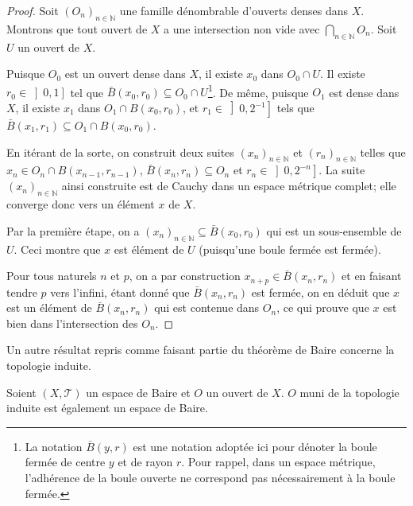 \begin{proof}
  Soit $(O_n)_{n\in\mathbb{N}}$ une famille dénombrable d'ouverts denses
  dans $X$. Montrons que tout ouvert de $X$ a une intersection non vide
  avec $\bigcap_{n\in\mathbb{N}}O_n$. Soit $U$ un ouvert de $X$.

  Puisque $O_0$ est un ouvert dense dans $X$, il existe $x_0$ dans
  $O_0\cap U$. Il existe $r_0 \in \left]0, 1\right]$ tel
  que $\bar{B}(x_0, r_0)\subseteq  O_0\cap U$\footnote{La notation
    $\bar{B}(y, r)$ est une notation adoptée ici pour dénoter la boule
    fermée de centre $y$ et de rayon $r$. Pour rappel, dans un espace
    métrique, l'adhérence de la boule ouverte ne correspond pas nécessairement
    à la boule fermée.}.
  De même, puisque $O_1$ est dense dans $X$, il existe $x_1$ dans
  $O_1\cap B(x_0, r_0)$, et $r_1\in\left]0, 2^{-1}\right]$ tels que
  $\bar{B}(x_1, r_1)\subseteq O_1\cap B(x_0, r_0)$.

  En itérant de la sorte, on construit deux suites $(x_n)_{n\in\mathbb{N}}$
  et $(r_n)_{n\in\mathbb{N}}$ telles que $x_n\in O_n\cap B(x_{n-1}, r_{n-1})$,
  $\bar{B}(x_n, r_n)\subseteq O_n$
  et $r_n\in\left]0, 2 ^{-n}\right]$. La suite $(x_n)_{n\in\mathbb{N}}$ ainsi
  construite est de Cauchy dans un espace métrique complet; elle converge
  donc vers un élément $x$ de $X$.

  Par la première étape, on a $(x_n)_{n\in\mathbb{N}}\subseteq \bar{B}(x_0, r_0)$
  qui est un sous-ensemble de $U$. Ceci montre que $x$ est élément de $U$
  (puisqu'une boule fermée est fermée).

  Pour tous naturels $n$ et $p$, on a par construction $x_{n+p}\in
  \bar{B}(x_n, r_n)$ et en faisant tendre $p$ vers l'infini, étant
  donné que $\bar{B}(x_n, r_n)$ est fermée, on en déduit que $x$
  est un élément de $\bar{B}(x_n, r_n)$ qui est contenue dans $O_n$,
  ce qui prouve que $x$ est bien dans l'intersection des $O_n$.
\end{proof}

Un autre résultat repris comme faisant partie du théorème de Baire concerne
la topologie induite.
\begin{thm}\label{baire:ind}
  Soient $(X, \mathcal{T})$ un espace de Baire et $O$ un ouvert de $X$.
  $O$ muni de la topologie induite est également un espace de Baire.
\end{thm}

